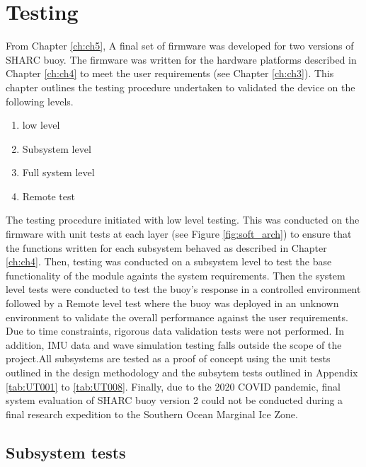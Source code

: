 
\chapter{Testing}
\label{ch:ch6}

From Chapter \ref{ch:ch5}, A final set of firmware was developed for two versions of SHARC buoy. The firmware was written for the hardware platforms described in Chapter \ref{ch:ch4} to meet the user requirements (see Chapter \ref{ch:ch3}). This chapter outlines the testing procedure undertaken to validated the device on the following levels.

\begin{enumerate}
	\item low level
	\item Subsystem level
	\item Full system level
	\item Remote test
\end{enumerate}

The testing procedure initiated with low level testing. This was conducted on the firmware with unit tests at each layer (see Figure \ref{fig:soft_arch}) to ensure that the functions written for each subsystem behaved as described in Chapter \ref{ch:ch4}. Then, testing was conducted on a subsystem level to test the base functionality of the module againts the system requirements. Then the system level tests were conducted to test the buoy's response in a controlled environment followed by a Remote level test where the buoy was deployed in an unknown environment to validate the overall performance against the user requirements. Due to time constraints, rigorous data validation tests were not performed. In addition, IMU data and wave simulation testing falls outside the scope of the project.All subsystems are tested as a proof of concept using the unit tests outlined in the design methodology and the subsytem tests outlined in Appendix \ref{tab:UT001} to \ref{tab:UT008}. Finally, due to the 2020 COVID pandemic, final system evaluation of SHARC buoy version 2 could not be conducted during a final research expedition to the Southern Ocean Marginal Ice Zone.  \par 



\section{Subsystem tests}

